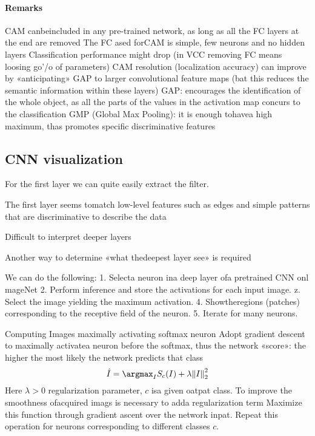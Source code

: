 \paragraph*{Remarks}
CAM canbeincluded in any pre-trained network, as long as all the FC
layers at the end are removed
The FC ased forCAM is simple, few neurons and no hidden layers
Classification performance might drop (in VCC removing FC means
loosing go'/o of parameters)
CAM resolution (localization accuracy) can improve by «anticipating»
GAP to larger convolutional feature maps (bat this reduces the
semantic information within these layers)
GAP: encourages the identification of the whole object, as all the parts
of the values in the activation map concurs to the classification
GMP (Global Max Pooling): it is enough tohavea high maximum, thas
promotes specific discriminative features
















\subsection{CNN visualization}
For the first layer we can quite easily extract the filter. 

The first layer seems tomatch low-level features such as edges
and simple patterns that
are discriminative to describe the data

Difficult to interpret deeper layers

Another way to determine «what thedeepest layer see» is
required

We can do the following: 
1. Selecta neuron ina deep layer ofa pretrained CNN onl mageNet
2. Perform inference and store the activations
for each input image.
z. Select the image yielding the maximum
activation.
4. Showtheregions (patches) corresponding to
the receptive field of the neuron.
5. Iterate for many neurons.



Computing Images maximally activating softmax neuron
Adopt gradient descent to maximally activatea neuron before the
softmax, thus the network «score»: the higher the most likely the
network predicts that class
\[\hat{I}=\argmax_I S_c(I)+\lambda{\left\lVert I\right\rVert}_2^2 \]
Here $\lambda> 0$ regularization parameter, $c$ isa given oatpat class.
To improve the smoothness ofacquired imags is necessary to adda
regularization term
Maximize this function through gradient ascent over the network inpat.
Repeat this operation for neurons corresponding to different classes $c$. 



